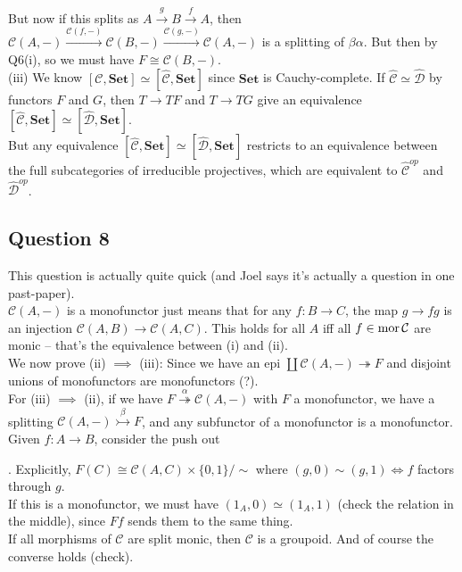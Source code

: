 \documentclass[a4paper]{article}
\begin{document}
But now if this splits as $A \xrightarrow{g} B \xrightarrow{f} A$, then $\mathcal{C}(A,-) \xrightarrow{\mathcal{C}(f,-)}\mathcal{C}(B,-) \xrightarrow{\mathcal{C}(g,-)} \mathcal{C}(A,-)$ is a splitting of $\beta\alpha$. But then by Q6(i), so we must have $F \cong \mathcal{C}(B,-)$.\\
(iii) We know $[\mathcal{C},\mathbf{Set}] \simeq [\hat{\mathcal{C}},\mathbf{Set}]$ since $\mathbf{Set}$ is Cauchy-complete. If $\hat{\mathcal{C}} \simeq \hat{\mathcal{D}}$ by functors $F$ and $G$, then $T \to TF$ and $T \to TG$ give an equivalence $[\hat{\mathcal{C}},\mathbf{Set}] \simeq [\hat{\mathcal{D}},\mathbf{Set}]$.\\
But any equivalence $[\hat{\mathcal{C}},\mathbf{Set}] \simeq [\hat{\mathcal{D}},\mathbf{Set}]$ restricts to an equivalence between the full subcategories of irreducible projectives, which are equivalent to $\hat{\mathcal{C}}^{op}$ and $\hat{\mathcal{D}}^{op}$.

\subsection{Question 8}
This question is actually quite quick (and Joel says it's actually a question in one past-paper).\\
$\mathcal{C}(A,-)$ is a monofunctor just means that for any $f:B \to C$, the map $g \to fg$ is an injection $\mathcal{C}(A,B) \to \mathcal{C}(A,C)$. This holds for all $A$ iff all $f \in \operatorname{mor}\mathcal{C}$ are monic -- that's the equivalence between (i) and (ii).\\
We now prove (ii) $\implies$ (iii): Since we have an epi $\coprod \mathcal{C}(A,-) \twoheadrightarrow F$ and disjoint unions of monofunctors are monofunctors (?).\\
For (iii) $\implies$ (ii), if we have $F \stackrel{\alpha}{\twoheadrightarrow} \mathcal{C}(A,-)$ with $F$ a monofunctor, we have a splitting $\mathcal{C}(A,-) \stackrel{\beta}{\rightarrowtail} F$, and any subfunctor of a monofunctor is a monofunctor.\\
Given $f:A \to B$, consider the push out
. Explicitly, $F(C) \cong \mathcal{C}(A,C) \times \{0,1\} / \sim$ where $(g,0) \sim (g,1) \iff f$ factors through $g$.\\
If this is a monofunctor, we must have $(1_A,0) \simeq (1_A,1)$ (check the relation in the middle), since $Ff$ sends them to the same thing.\\
If all morphisms of $\mathcal{C}$ are split monic, then $\mathcal{C}$ is a groupoid. And of course the converse holds (check).
\end{document}
